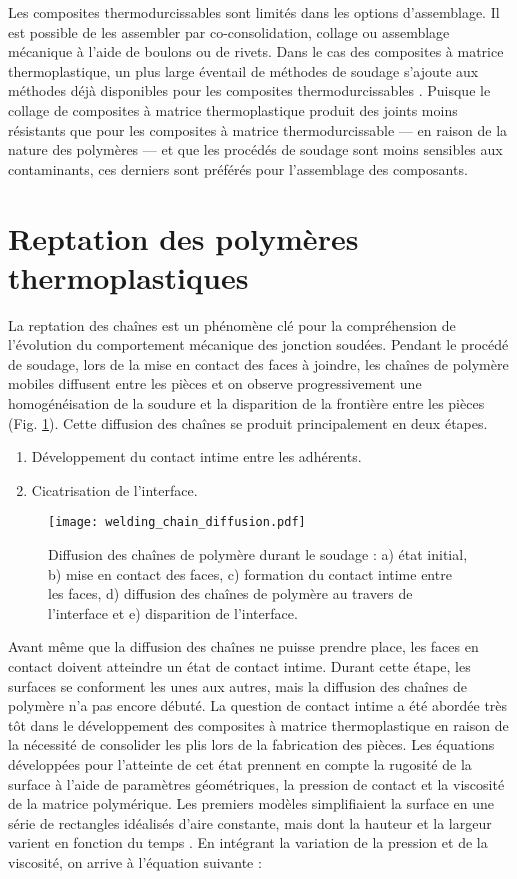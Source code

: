 Les composites thermodurcissables sont limités dans les options d'assemblage. 
Il est possible de les assembler par co-consolidation, collage ou assemblage mécanique à l'aide de boulons ou de rivets.
Dans le cas des composites à matrice thermoplastique, un plus large éventail de méthodes de soudage s'ajoute aux méthodes déjà disponibles pour les composites thermodurcissables \cite{campbell2003}. 
Puisque le collage de composites à matrice thermoplastique produit des joints moins résistants que pour les composites à matrice thermodurcissable --- en raison de la nature des polymères \cite{campbell2003} --- et que les procédés de soudage sont moins sensibles aux contaminants, ces derniers sont préférés pour l'assemblage des composants. 

\section{Reptation des polymères thermoplastiques}

La reptation des chaînes est un phénomène clé pour la compréhension de l'évolution du comportement mécanique des jonction soudées. 
Pendant le procédé de soudage, lors de la mise en contact des faces à joindre, les chaînes de polymère mobiles diffusent entre les pièces et on observe progressivement une homogénéisation de la soudure et la disparition de la frontière entre les pièces (Fig. \ref{fig:polymer_diffusion}). 
Cette diffusion des chaînes se produit principalement en deux étapes. 
\begin{enumerate}
	\item Développement du contact intime entre les adhérents.
	\item Cicatrisation de l'interface.
\end{enumerate}

\begin{figure}[h]
	\centering
	\texttt{[image: welding\_chain\_diffusion.pdf]}
	\caption{Diffusion des chaînes de polymère durant le soudage : a) état initial, b) mise en contact des faces, c) formation du contact intime entre les faces, d) diffusion des chaînes de polymère au travers de l'interface et e) disparition de l'interface. }
	\label{fig:polymer_diffusion}
\end{figure}

Avant même que la diffusion des chaînes ne puisse prendre place, les faces en contact doivent atteindre un état de contact intime. 
Durant cette étape, les surfaces se conforment les unes aux autres, mais la diffusion des chaînes de polymère n'a pas encore débuté. 
La question de contact intime a été abordée très tôt dans le développement des composites à matrice thermoplastique en raison de la nécessité de consolider les plis lors de la fabrication des pièces. 
Les équations développées pour l'atteinte de cet état prennent en compte la rugosité de la surface à l'aide de paramètres géométriques, la pression de contact et la viscosité de la matrice polymérique. 
Les premiers modèles simplifiaient la surface en une série de rectangles idéalisés d'aire constante, mais dont la hauteur et la largeur varient en fonction du temps \cite{Lee1987}. 
En intégrant la variation de la pression et de la viscosité, on arrive à l'équation suivante \cite{Mantell1992a} : 

